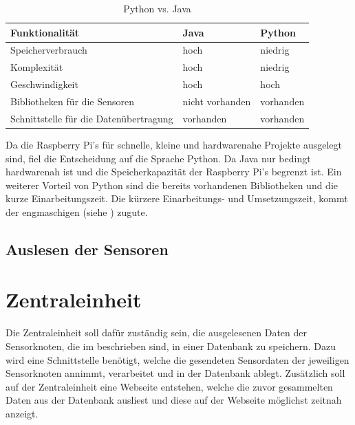 \begin{table}[htb]
	\centering
	\caption{Python vs. Java}
	\label{tab:phytionvsjava}
	\begin{tabular}{l|l|l}
	\textbf{Funktionalität} & \textbf{Java} &\textbf{Python}   \\
	\hline
	 Speicherverbrauch & hoch & niedrig \\\hline
	Komplexität  & hoch & niedrig\\\hline
	Geschwindigkeit  & hoch & hoch \\\hline
	Bibliotheken für die Sensoren & nicht vorhanden & vorhanden \\\hline
	Schnittstelle für die Datenübertragung & vorhanden & vorhanden
	\end{tabular}
\end{table}
\noindent Da die Raspberry Pi's für schnelle, kleine und hardwarenahe Projekte ausgelegt sind, fiel die Entscheidung auf die Sprache Python. Da Java nur bedingt hardwarenah ist und die Speicherkapazität der Raspberry Pi's begrenzt ist. Ein weiterer Vorteil von Python sind die bereits vorhandenen Bibliotheken und die kurze Einarbeitungszeit. Die kürzere Einarbeitungs- und Umsetzungszeit, kommt der engmaschigen  (siehe ) zugute.

\subsection{Auslesen der Sensoren}
\section{Zentraleinheit}
Die Zentraleinheit soll dafür zuständig sein, die ausgelesenen Daten der Sensorknoten, die im  beschrieben sind, in einer Datenbank zu speichern. Dazu wird eine Schnittstelle benötigt, welche die gesendeten Sensordaten der jeweiligen Sensorknoten annimmt, verarbeitet und in der Datenbank ablegt. Zusätzlich soll auf der Zentraleinheit eine Webseite entstehen, welche die zuvor gesammelten Daten aus der Datenbank ausliest und diese auf der Webseite möglichst zeitnah anzeigt.

